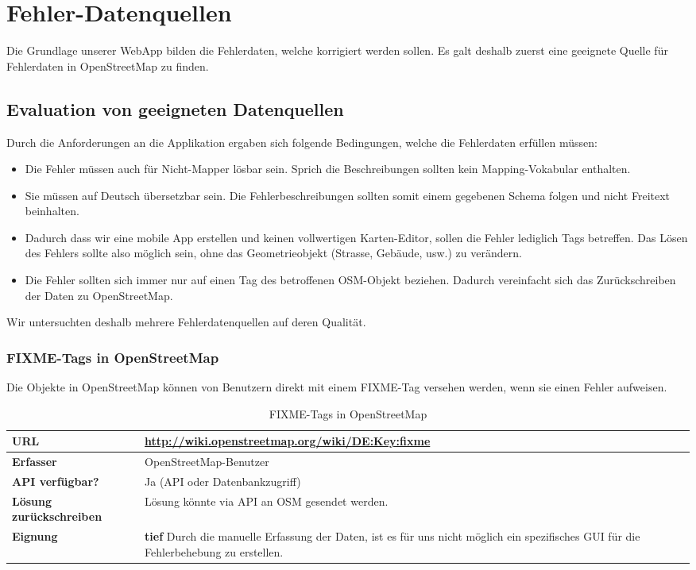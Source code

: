 \chapter{Fehler-Datenquellen}
\label{datenquellen}
Die Grundlage unserer WebApp bilden die Fehlerdaten, welche korrigiert werden sollen.
Es galt deshalb zuerst eine geeignete Quelle für Fehlerdaten in OpenStreetMap zu finden.

\section{Evaluation von geeigneten Datenquellen}
Durch die Anforderungen an die Applikation ergaben sich folgende Bedingungen, welche die Fehlerdaten erfüllen müssen:

\begin{itemize}
\item Die Fehler müssen auch für Nicht-Mapper lösbar sein. Sprich die Beschreibungen sollten kein Mapping-Vokabular enthalten.
\item Sie müssen auf Deutsch übersetzbar sein. Die Fehlerbeschreibungen sollten somit einem gegebenen Schema folgen und nicht Freitext beinhalten.
\item Dadurch dass wir eine mobile App erstellen und keinen vollwertigen Karten-Editor, sollen die Fehler lediglich Tags betreffen. Das Lösen des Fehlers sollte also möglich sein, ohne das Geometrieobjekt (Strasse, Gebäude, usw.) zu verändern.
\item Die Fehler sollten sich immer nur auf einen Tag des betroffenen OSM-Objekt beziehen. Dadurch vereinfacht sich das Zurückschreiben der Daten zu OpenStreetMap.
\end{itemize}

Wir untersuchten deshalb mehrere Fehlerdatenquellen auf deren Qualität.

\subsection{FIXME-Tags in OpenStreetMap}
Die Objekte in OpenStreetMap können von Benutzern direkt mit einem FIXME-Tag versehen werden, wenn sie einen Fehler aufweisen.

\begin{table}[H]
\centering
\begin{tabular}{|p{0.25\twocelltabwidth}|p{0.75\twocelltabwidth}|}
\hline 
\textbf{URL} & \url{http://wiki.openstreetmap.org/wiki/DE:Key:fixme} \\
\hline 
\textbf{Erfasser} & OpenStreetMap-Benutzer \\
\hline 
\textbf{API verfügbar?} & Ja (API oder Datenbankzugriff) \\
\hline 
\textbf{Lösung zurückschreiben} & Lösung könnte via API an OSM gesendet werden. \\
\hline
\textbf{Eignung} & \textbf{tief} \linebreak Durch die manuelle Erfassung der Daten, ist es für uns nicht möglich ein spezifisches GUI für die Fehlerbehebung zu erstellen. \\ 
\hline 
\end{tabular} 
\caption{FIXME-Tags in OpenStreetMap}
\label{datenquellen-fixme_tags_osm}
\end{table}

